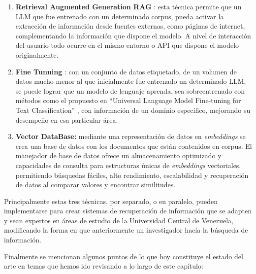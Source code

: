 \documentclass[
  12pt,
  openany]{book}
\begin{document}
\begin{enumerate}
\def\labelenumi{\arabic{enumi}.}
\item
  \textbf{Retrieval Augmented Generation RAG} \citep{lewis2020}: esta técnica permite que un LLM que fue entrenado con un determinado corpus, pueda activar la extracción de información desde fuentes externas, como páginas de internet, complementando la información que dispone el modelo. A nivel de interacción del usuario todo ocurre en el mismo entorno o API que dispone el modelo originalmente.
\item
  \textbf{Fine Tunning} \citep{lv2023}: con un conjunto de datos etiquetado, de un volumen de datos mucho menor al que inicialmente fue entrenado un determinado LLM, se puede lograr que un modelo de lenguaje aprenda, sea sobreentrenado con métodos como el propuesto en ``Universal Language Model Fine-tuning for Text Classification'' \citep{howard2018}, con información de un dominio específico, mejorando su desempeño en esa particular área.
\item
  \textbf{Vector DataBase:} mediante una representación de datos en \emph{embeddings} se crea una base de datos con los documentos que están contenidos en corpus. El manejador de base de datos ofrece un almacenamiento optimizado y capacidades de consulta para estructuras únicas de \emph{embeddings} vectoriales, permitiendo búsquedas fáciles, alto rendimiento, escalabilidad y recuperación de datos al comparar valores y encontrar similitudes.
\end{enumerate}

Principalmente estas tres técnicas, por separado, o en paralelo, pueden implementarse para crear sistemas de recuperación de información que se adapten y sean expertos en áreas de estudio de la Universidad Central de Venezuela, modificando la forma en que anteriormente un investigador hacía la búsqueda de información.

Finalmente se mencionan algunos puntos de lo que hoy constituye el estado del arte en temas que hemos ido revisando a lo largo de este capítulo:
\end{document}
